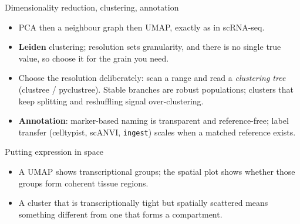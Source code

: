 \documentclass[aspectratio=169]{beamer}
\begin{document}
\begin{frame}{Dimensionality reduction, clustering, annotation}
  \begin{itemize}
    \item PCA then a neighbour graph then UMAP, exactly as in scRNA-seq.
    \item \textbf{Leiden} clustering; resolution sets granularity, and there is no
      single true value, so choose it for the grain you need.
    \item Choose the resolution deliberately: scan a range and read a
      \emph{clustering tree} (clustree / pyclustree). Stable branches are robust
      populations; clusters that keep splitting and reshuffling signal
      over-clustering.
    \item \textbf{Annotation}: marker-based naming is transparent and reference-free;
      label transfer (celltypist, scANVI, \texttt{ingest}) scales when a matched
      reference exists.
  \end{itemize}
\end{frame}

\begin{frame}{Putting expression in space}
  \begin{itemize}
    \item A UMAP shows transcriptional groups; the spatial plot shows whether those
      groups form coherent tissue regions.
    \item A cluster that is transcriptionally tight but spatially scattered means
      something different from one that forms a compartment.
  \end{itemize}
\end{frame}
\end{document}

